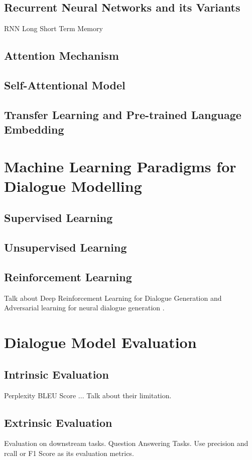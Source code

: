 \documentclass[bsc,frontabs,twoside,singlespacing,parskip,deptreport]{infthesis}     %
\begin{document}
\subsection{Recurrent Neural Networks and its Variants}
RNN
Long Short Term Memory
\subsection{Attention Mechanism}
\subsection{Self-Attentional Model}
\subsection{Transfer Learning and Pre-trained Language Embedding}


\section{Machine Learning Paradigms for Dialogue Modelling}
\subsection{Supervised Learning}
\subsection{Unsupervised Learning}
\subsection{Reinforcement Learning}
Talk about Deep Reinforcement Learning for Dialogue Generation\cite{li2016deep} and Adversarial learning for neural dialogue generation \cite{li2017adversarial}.





\section{Dialogue Model Evaluation}
\subsection{Intrinsic Evaluation}
Perplexity
BLEU Score
...
Talk about their limitation.
\subsection{Extrinsic Evaluation}
Evaluation on downstream tasks.
Question Answering Tasks. Use precision and rcall or F1 Score as its evaluation metrics.
\end{document}
